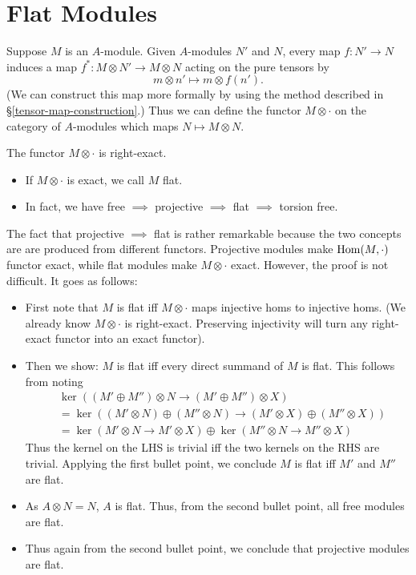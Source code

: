 \section{Flat Modules}
Suppose $M$ is an $A$-module. Given $A$-modules $N'$ and $N$, every map $f: N' \rightarrow N$ induces a map $f^*: M \otimes N' \rightarrow M \otimes N$ acting on the pure tensors by
\[
    m \otimes n' \mapsto m \otimes f(n').
\]
(We can construct this map more formally by using the method described in \S \ref{tensor-map-construction}.) Thus we can define the functor $M \otimes \cdot$ on the category of $A$-modules which maps $N \mapsto M \otimes N$.

The functor $M \otimes \cdot$ is right-exact.
\begin{itemize}
    \item If $M \otimes \cdot$ is exact, we call $M$ flat.
    \item In fact, we have free $\implies$ projective $\implies$ flat $\implies$ torsion free.
\end{itemize}
The fact that projective $\implies$ flat is rather remarkable because the two concepts are are produced from different functors. Projective modules make $\operatorname{Hom}(M, \cdot)$ functor exact, while flat modules make $M \otimes \cdot$ exact. However, the proof is not difficult. It goes as follows:
\begin{itemize}
    \item First note that $M$ is flat iff $M \otimes \cdot$ maps injective homs to injective homs. (We already know $M \otimes \cdot$ is right-exact. Preserving injectivity will turn any right-exact functor into an exact functor).
    \item Then we show: $M$ is flat iff every direct summand of $M$ is flat. This follows from noting
        \[
            \begin{split}
                &   \ker\left((M' \oplus M'') \otimes N \rightarrow (M' \oplus M'') \otimes X\right)\\ 
                &= \ker\left((M' \otimes N) \oplus (M'' \otimes N) \rightarrow (M' \otimes X) \oplus (M'' \otimes X)\right)\\
                &= \ker\left(M' \otimes N \rightarrow M' \otimes X\right) \oplus \ker\left(M'' \otimes N \rightarrow M'' \otimes X\right)
            \end{split}
        \]
        Thus the kernel on the LHS is trivial iff the two kernels on the RHS are trivial. Applying the first bullet point, we conclude $M$ is flat iff $M'$ and $M''$ are flat.
    \item As $A \otimes N = N$, $A$ is flat. Thus, from the second bullet point, all free modules are flat.
    \item Thus again from the second bullet point, we conclude that projective modules are flat.
\end{itemize}
